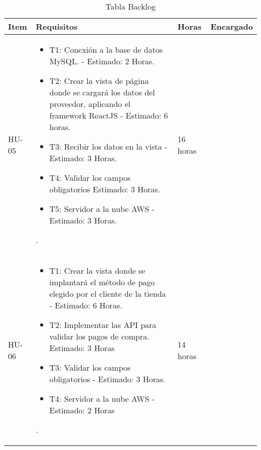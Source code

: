 \begin{table}[htbp]
	\begin{center}
		\begin{tabular}{|p{2.5cm}|p{6.5cm}|p{2.5cm}|p{2.5cm}|}
			\hline
			Item & Requisitos & Horas & Encargado\\
			\hline \hline
			HU-05 & \begin{itemize}
				\item T1: Conexión a la base de datos MySQL. - Estimado: 2 Horas.
				
				\item T2: Crear la vista de página donde se cargará los datos del proveedor, aplicando el framework ReactJS  - Estimado: 6 horas.
				
				
				\item T3: Recibir los datos en la vista - Estimado: 3 Horas.
				
				\item T4: Validar los campos obligatorios  Estimado: 3 Horas.
				
				\item T5: Servidor a la nube AWS  - Estimado: 3 Horas.
				
				
				
				
			\end{itemize}. & 16 horas & \\ \hline
			HU-06 &  \begin{itemize}
				\item T1: Crear la vista donde se implantará el método de pago elegido por el cliente de la tienda - Estimado: 6 Horas.
				
				\item T2: Implementar las API para validar los pagos de compra. 
				Estimado: 3 Horas
				
				
				\item T3: Validar los campos obligatorios  - Estimado: 3 Horas.
				
				\item T4: Servidor a la nube AWS  - Estimado: 2 Horas
				
				
			\end{itemize}. & 14 horas & \\ \hline
			
			
			
		\end{tabular}
		\caption{Tabla Backlog}
		\label{tabla:sencilla}
	\end{center}
\end{table}